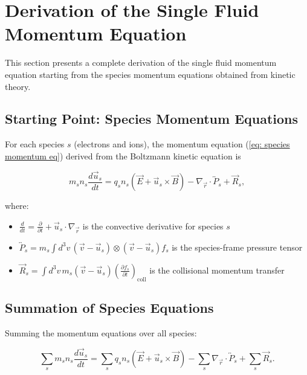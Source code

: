\section{Derivation of the Single Fluid Momentum Equation}
\label{sec:Derivation of the Single Fluid Momentum Equation}

This section presents a complete derivation of the single fluid momentum equation starting from the species momentum equations obtained from kinetic theory.

\subsection*{Starting Point: Species Momentum Equations}

For each species $s$ (electrons and ions), the momentum equation (\ref{eq: species momentum eq}) derived from the Boltzmann kinetic equation is

\begin{equation*}
m_s n_s \frac{d\vec{u}_s}{dt} = q_s n_s (\vec{E} + \vec{u}_s \times \vec{B}) - \nabla_{\vec{r}} \cdot \overleftrightarrow{P}_s + \vec{R}_s,
\end{equation*}

where:
\begin{itemize}
\item $\displaystyle \frac{d}{dt} = \frac{\partial}{\partial t} + \vec{u}_s \cdot \nabla_{\vec{r}}$ is the convective derivative for species $s$
\item $\displaystyle \overleftrightarrow{P}_s = m_s \int d^3v \, (\vec{v} - \vec{u}_s) \otimes (\vec{v} - \vec{u}_s) f_s$ is the species-frame pressure tensor
\item $\displaystyle \vec{R}_s = \int d^3v \, m_s (\vec{v} - \vec{u}_s) \left(\frac{\partial f_s}{\partial t}\right)_{\text{coll}}$ is the collisional momentum transfer
\end{itemize}

\subsection*{Summation of Species Equations}

Summing the momentum equations over all species:

\begin{equation*}
\sum_s m_s n_s \frac{d\vec{u}_s}{dt} = \sum_s q_s n_s (\vec{E} + \vec{u}_s \times \vec{B}) - \sum_s \nabla_{\vec{r}} \cdot \overleftrightarrow{P}_s + \sum_s \vec{R}_s.
\end{equation*}

